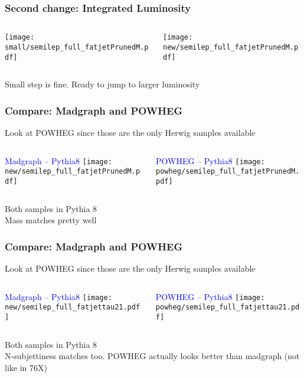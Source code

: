 \documentclass{beamer}
\begin{document}
\begin{frame}
  \frametitle{Second change: Integrated Luminosity}
  \begin{columns}
    \begin{column}{0.5\linewidth}
      \centering
      \texttt{[image: small/semilep\_full\_fatjetPrunedM.pdf]}
    \end{column}
    \begin{column}{0.5\linewidth}
      \centering
      \texttt{[image: new/semilep\_full\_fatjetPrunedM.pdf]}
    \end{column}
  \end{columns}
  Small step is fine. Ready to jump to larger luminosity
\end{frame}

\begin{frame}
  \frametitle{Compare: Madgraph and POWHEG}
  Look at POWHEG since those are the only Herwig samples available
  \vspace{6pt}
  \begin{columns}
    \begin{column}{0.5\linewidth}
      \centering
      \textcolor{blue}{Madgraph -- Pythia8}
      \texttt{[image: new/semilep\_full\_fatjetPrunedM.pdf]}
    \end{column}
    \begin{column}{0.5\linewidth}
      \centering
      \textcolor{blue}{POWHEG -- Pythia8}
      \texttt{[image: powheg/semilep\_full\_fatjetPrunedM.pdf]}
    \end{column}
  \end{columns}
  Both samples in Pythia 8 \\
  Mass matches pretty well
\end{frame}

\begin{frame}
  \frametitle{Compare: Madgraph and POWHEG}
  Look at POWHEG since those are the only Herwig samples available
  \vspace{6pt}
  \begin{columns}
    \begin{column}{0.5\linewidth}
      \centering
      \textcolor{blue}{Madgraph -- Pythia8}
      \texttt{[image: new/semilep\_full\_fatjettau21.pdf]}
    \end{column}
    \begin{column}{0.5\linewidth}
      \centering
      \textcolor{blue}{POWHEG -- Pythia8}
      \texttt{[image: powheg/semilep\_full\_fatjettau21.pdf]}
    \end{column}
  \end{columns}
  Both samples in Pythia 8 \\
  N-subjettiness matches too. POWHEG actually looks better than madgraph (not like in 76X)
\end{frame}
\end{document}
